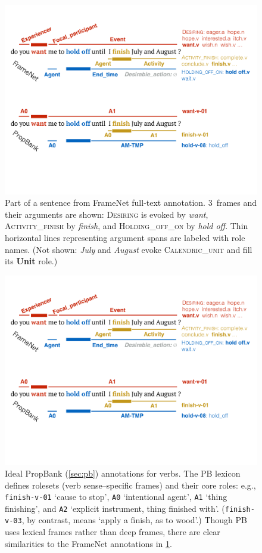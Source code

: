 \documentclass[11pt,a4paper]{article}
\newcommand{\fnf}[1]{\textsc{\textsf{#1}}} %
\newcommand{\fnr}[1]{\textbf{\textsf{#1}}} %
\begin{document}
\begin{figure}
\includegraphics[width=\columnwidth]{fig/hold-off-fn.pdf}
\caption{Part of a sentence from FrameNet full-text annotation. 
3~frames and their arguments are shown: 
\fnf{Desiring} is evoked by \textit{want},
\fnf{Activity\_finish} by \textit{finish}, 
and \fnf{Holding\_off\_on} by \textit{hold off}. 
Thin horizontal lines representing argument spans 
are labeled with role names.
(Not shown: \textit{July} and \textit{August} evoke \fnf{Calendric\_unit} 
and fill its \fnr{Unit} role.)
}
\label{fig:hold-off-fn}
\end{figure}

\begin{figure}
\includegraphics[width=\columnwidth]{fig/hold-off-pb.pdf}
\caption{Ideal PropBank (\cref{sec:pb}) annotations for verbs. 
The PB lexicon defines rolesets (verb sense--specific frames) and their core roles: 
e.g., \texttt{finish-v-01} `cause to stop', \texttt{A0} `intentional agent', \texttt{A1} `thing finishing', 
and \texttt{A2} `explicit instrument, thing finished with'. (\texttt{finish-v-03}, by contrast, 
means `apply a finish, as to wood'.) 
Though PB uses lexical frames rather than deep frames,
there are clear similarities to the FrameNet annotations in \cref{fig:hold-off-fn}.}
\label{fig:hold-off-pb}
\end{figure}
\end{document}
